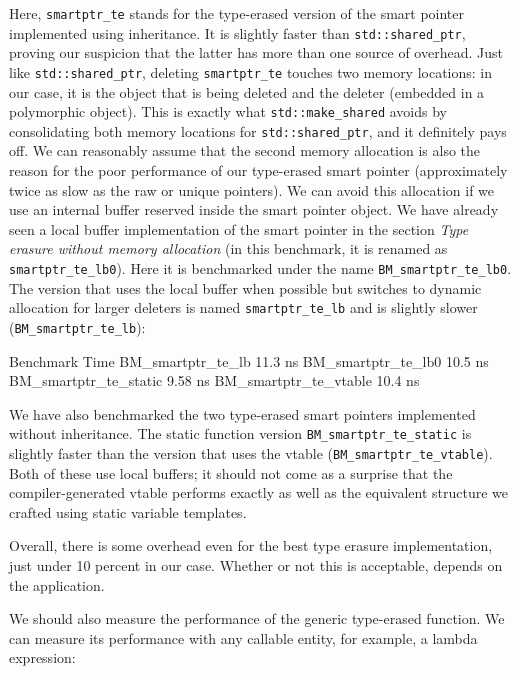 {Here, \texttt{smartptr\_te} stands for the type-erased version of the smart pointer implemented using inheritance. It is slightly faster than \texttt{std::shared\_ptr}, proving our suspicion that the latter has more than one source of overhead. Just like \texttt{std::shared\_ptr}, deleting \texttt{smartptr\_te} touches two memory locations: in our case, it is the object that is being deleted and the deleter (embedded in a polymorphic object). This is exactly what \texttt{std::make\_shared} avoids by consolidating both memory locations for \texttt{std::shared\_ptr}, and it definitely pays off. We can reasonably assume that the second memory allocation is also the reason for the poor performance of our type-erased smart pointer (approximately twice as slow as the raw or unique pointers). We can avoid this allocation if we use an internal buffer reserved inside the smart pointer object. We have already seen a local buffer implementation of the smart pointer in the section \emph{Type erasure without memory allocation} (in this benchmark, it is renamed as \texttt{smartptr\_te\_lb0}). Here it is benchmarked under the name \texttt{BM\_smartptr\_te\_lb0}. The version that uses the local buffer when possible but switches to dynamic allocation for larger deleters is named \texttt{smartptr\_te\_lb} and is slightly slower (\texttt{BM\_smartptr\_te\_lb}):

\begin{code}
Benchmark                      Time
BM_smartptr_te_lb           11.3 ns
BM_smartptr_te_lb0          10.5 ns
BM_smartptr_te_static       9.58 ns
BM_smartptr_te_vtable       10.4 ns
\end{code}

We have also benchmarked the two type-erased smart pointers implemented without inheritance. The static function version \texttt{BM\_smartptr\_te\_static} is slightly faster than the version that uses the vtable (\texttt{BM\_smartptr\_te\_vtable}). Both of these use local buffers; it should not come as a surprise that the compiler-generated vtable performs exactly as well as the equivalent structure we crafted using static variable templates.

Overall, there is some overhead even for the best type erasure implementation, just under 10 percent in our case. Whether or not this is acceptable, depends on the application.

We should also measure the performance of the generic type-erased function. We can measure its performance with any callable entity, for example, a lambda expression:

}
